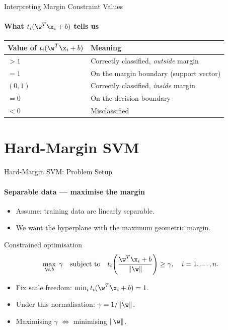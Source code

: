 \begin{frame}{Interpreting Margin Constraint Values}
  \framesubtitle{What $t_i(\w^T\x_i+b)$ tells us}
  \begin{center}
    \begin{tabular}{ll}
      \toprule
      Value of $t_i(\w^T\x_i+b)$ & Meaning \\
      \midrule
      $> 1$ & Correctly classified, \emph{outside} margin \\
      $= 1$ & On the margin boundary (support vector) \\
      $(0,1)$ & Correctly classified, \emph{inside} margin \\
      $= 0$ & On the decision boundary \\
      $< 0$ & \alert{Misclassified} \\
      \bottomrule
    \end{tabular}
  \end{center}
\end{frame}

\section{Hard-Margin SVM}

\begin{frame}{Hard-Margin SVM: Problem Setup}
  \framesubtitle{Separable data — maximise the margin}
  \begin{itemize}
    \item Assume: training data are \alert{linearly separable}.
    \item We want the hyperplane with the \alert{maximum geometric margin}.
  \end{itemize}
  \begin{block}{Constrained optimisation}
    \[
      \max_{\w,b} \; \gamma \quad \text{subject to}\quad
      t_i\!\left(\frac{\w^T\x_i + b}{\|\w\|}\right) \ge \gamma, \quad i=1,\ldots,n.
    \]
  \end{block}
  \vspace{0.3em}
  \begin{itemize}
    \item Fix scale freedom: $\min_i t_i(\w^T\x_i+b) = 1$.
    \item Under this normalisation: $\gamma = 1/\|\w\|$.
    \item Maximising $\gamma$ $\Leftrightarrow$ \alert{minimising $\|\w\|$}.
  \end{itemize}
\end{frame}

